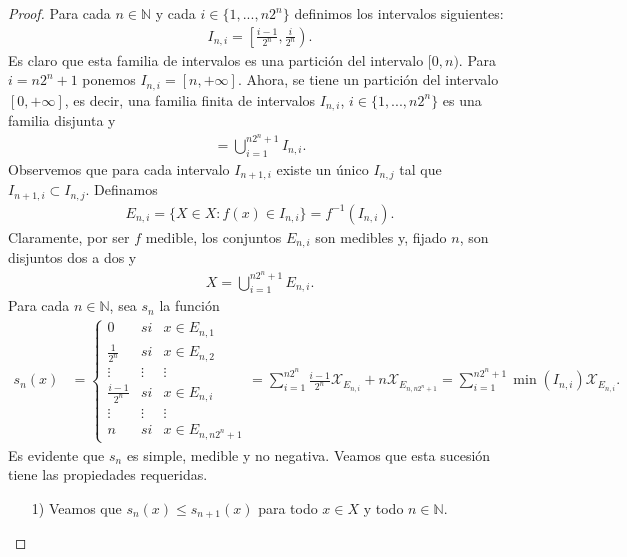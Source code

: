 \begin{proof}
Para cada $n \in \mathbb{N}$ y cada $i \in \{ 1, ..., n2^n\}$ definimos los intervalos siguientes:
\begin{align*}
    I_{n,i} = \left[ \frac{i-1}{2^n}, \frac{i}{2^n} \right).
\end{align*}
Es claro que esta familia de intervalos es una partición del intervalo $[0,n)$. Para $i = n2^n + 1$ ponemos $I_{n,i} = [n, +\infty]$. Ahora, se tiene un partición del intervalo $[0, +\infty]$, es decir, una familia finita de intervalos $I_{n,i}$, $i \in \{1,...,n2^n \}$ es una familia disjunta y
\begin{align*}
    [0, +\infty] = \bigcup_{i=1}^{n2^n + 1}{I_{n,i}}.
\end{align*}
Observemos que para cada intervalo $I_{n+1,i}$ existe un único $I_{n,j}$ tal que $I_{n+1,i} \subset I_{n,j}$. Definamos
\begin{align*}
    E_{n,i} = \{ X \in X : f(x) \in I_{n,i} \} = f^{-1}(I_{n,i}).
\end{align*}
Claramente, por ser $f$ medible, los conjuntos $E_{n,i}$ son medibles y, fijado $n$, son disjuntos dos a dos y 
\begin{align*}
    X = \bigcup_{i=1}^{n2^n +1}{E_{n,i}}.
\end{align*}
Para cada $n \in \mathbb{N}$, sea $s_n$ la función
\begin{align*}
    s_n(x) &= \left\{ \begin{array}{lcc}
             0 &  si  & x \in E_{n,1}\\
             \frac{1}{2^n} &  si  & x \in E_{n,2} \\
             \vdots & \vdots & \vdots \\
             \frac{i-1}{2^n} & si & x \in E_{n,i}\\
             \vdots & \vdots & \vdots  \\
             n & si & x \in E_{n,n2^n+1}
             \end{array}
   \right.
   = \sum_{i=1}^{n2^n}{\frac{i-1}{2^n}\mathcal{X}_{E_{n,i}}} + n\mathcal{X}_{E_{n,n2^n+1}} = \sum_{i=1}^{n2^n +1}{\min(I_{n,i})\mathcal{X}_{E_{n,i}}}.
\end{align*}
Es evidente que $s_n$ es simple, medible y no negativa. Veamos que esta sucesión tiene las propiedades requeridas.
\begin{enumerate}
    \item[1)] Veamos que $s_n(x) \leq s_{n+1}(x)$ para todo $x \in X$ y todo $n \in \mathbb{N}$.
    \\

\end{enumerate}
\end{proof}
